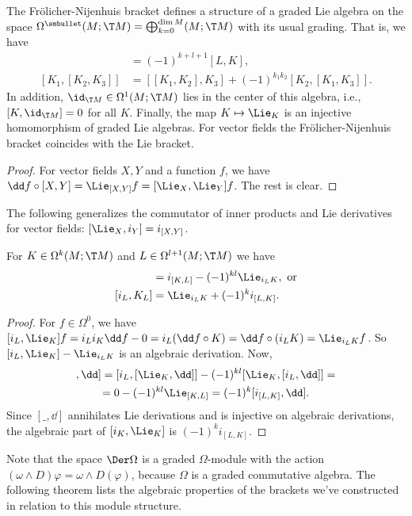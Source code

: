 \begin{thm}
    The Fr\"olicher-Nijenhuis bracket defines a structure of a graded Lie algebra on the space $\Omega^{\smbullet}(M;\T M)=\bigoplus_{k=0}^{\dim M}(M;\T M)$ with its usual grading. That is, we have 
    \begin{align}
        [K,L]&=(-1)^{k+l+1}[L,K],\\
        [K_1,[K_2,K_3]]&=[[K_1,K_2],K_3]+(-1)^{k_1k_2}[K_2,[K_1,K_3]].
    \end{align}
    In addition, $\id_{\T M}\in\Omega^1(M;\T M)$ lies in the center of this algebra, i.e., $[K,\id_{\T M}]=0$ for all $K$. Finally, the map $K\mapsto \Lie_K$ is an injective homomorphism of graded Lie algebras. For vector fields the Fr\"olicher-Nijenhuis bracket coincides with the Lie bracket.
\end{thm}
\begin{proof}
    For vector fields $X,Y$ and a function $f$, we have $\dd f\circ [X,Y]=\Lie_{[X,Y]}f=[\Lie_X,\Lie_Y]f$. The rest is clear.
\end{proof}

The following generalizes the commutator of inner products and Lie derivatives for vector fields: $[\Lie_X,i_Y]=i_{[X,Y]}$.
\begin{lem}\label{lem 8.6 Kolar}
    For $K\in\Omega^k(M;\T M)$ and $L\in\Omega^{l+1}(M;\T M)$ we have 
    \begin{align}
        [\Lie_K,i_L]&=i_{[K,L]}-(-1)^{kl}\Lie_{i_L K}, \text{ or}\\
        [i_L,K_L]&=\Lie_{i_L K}+(-1)^ki_{[L,K]}.
    \end{align}
\end{lem}
\begin{proof}
    For $f\in\Omega^0$, we have $[i_L,\Lie_K]f=i_Li_K\dd f-0=i_L(\dd f\circ K)=\dd f\circ (i_L K)=\Lie_{i_L K} f$. So $[i_L,\Lie_K]-\Lie_{i_L K}$ is an algebraic derivation. Now, 
    \begin{multline}
        [[i_L,\Lie_K],\dd]=[i_L,[\Lie_K,\dd]]-(-1)^{kl}[\Lie_K,[i_L,\dd]]=\\
        =0-(-1)^{kl}\Lie_{[K,L]}=(-1)^k[i_{[L,K]},\dd].
    \end{multline}
    Since $[\_,\dd]$ annihilates Lie derivations and is injective on algebraic derivations, the algebraic part of $[i_K,\Lie_K]$ is $(-1)^k i_{[L,K]}$.
\end{proof}


Note that the space $\Der \Omega$ is a graded $\Omega$-module with the action $(\omega\wedge D)\varphi=\omega\wedge D(\varphi)$, because $\Omega$ is a graded commutative algebra. The following theorem lists the algebraic properties of the brackets we've constructed in relation to this module structure.

